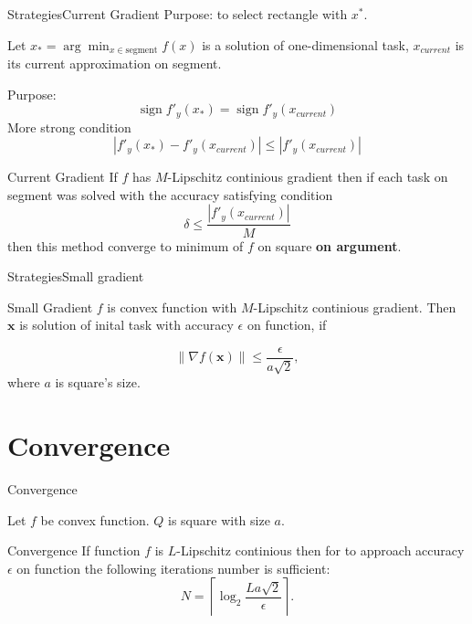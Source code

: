 \documentclass{beamer}
\DeclareMathOperator{\sign}{sign}
\begin{document}
\begin{frame}{Strategies}{Current Gradient}
Purpose: to select rectangle with $x^*$.
\pause

Let $x_* =\arg\min_{x \in \text{segment}}f(x)$ is a solution of one-dimensional task, $x_{current}$ is its current approximation on segment.

Purpose:
    $$\sign f'_y(x_*) = \sign f'_y(x_{current})$$
\pause    
More strong condition
    $$|f'_y(x_*) - f'_y(x_{current})| \leq |f'_y(x_{current})|$$
\pause
\begin{block}{Current Gradient}
If $f$ has $M$-Lipschitz continious gradient then if each task on segment was solved with the accuracy satisfying condition
  $$\boxed{\delta \leq \frac{|f'_y(x_{current})|}{M}}$$
then this method converge to minimum of $f$ on square \textbf{on argument}.
\end{block}
\end{frame}

\begin{frame}{Strategies}{Small gradient}
\begin{block}{Small Gradient}
$f$ is convex function with $M$-Lipschitz continious gradient. Then $\textbf{x}$ is solution of inital task with accuracy $\epsilon$ on function, if

$$\|\nabla f(\textbf{x})\|\leq \frac{\epsilon}{a\sqrt{2}}, $$
where $a$ is square's size.
\end{block}
\end{frame}

\section{Convergence}

\begin{frame}{Convergence}

Let $f$ be convex function. $Q$ is square with size $a$.

\begin{block}{Convergence}
If function $f$ is $L$-Lipschitz continious then for to approach accuracy $\epsilon$ on function the following iterations number is sufficient:
\begin{equation}\label{NI1}N = \left\lceil\log_2\frac{La\sqrt{2}}{\epsilon}\right\rceil.\end{equation}
\end{block}

\end{frame}
\end{document}
